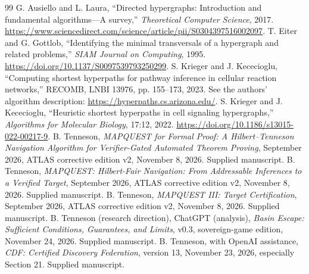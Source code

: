 \documentclass[11pt]{article}
\theoremstyle{remark}\newtheorem{remark}[theorem]{Remark}
\begin{document}
\begin{thebibliography}{99}\small
{} G. Ausiello and L. Laura, ``Directed hypergraphs: Introduction and fundamental algorithms---A survey,'' \emph{Theoretical Computer Science}, 2017. \url{https://www.sciencedirect.com/science/article/pii/S0304397516002097}.
 T. Eiter and G. Gottlob, ``Identifying the minimal transversals of a hypergraph and related problems,'' \emph{SIAM Journal on Computing}, 1995. \url{https://doi.org/10.1137/S0097539793250299}.
 S. Krieger and J. Kececioglu, ``Computing shortest hyperpaths for pathway inference in cellular reaction networks,'' RECOMB, LNBI 13976, pp. 155--173, 2023. See the authors' algorithm description: \url{https://hyperpaths.cs.arizona.edu/}.
 S. Krieger and J. Kececioglu, ``Heuristic shortest hyperpaths in cell signaling hypergraphs,'' \emph{Algorithms for Molecular Biology}, 17:12, 2022. \url{https://doi.org/10.1186/s13015-022-00217-9}.
 B. Tenneson, \emph{MAPQUEST for Formal Proof: A Hilbert--Tenneson Navigation Algorithm for Verifier-Gated Automated Theorem Proving}, September 2026, ATLAS corrective edition v2, November 8, 2026. Supplied manuscript.
 B. Tenneson, \emph{MAPQUEST: Hilbert-Fair Navigation: From Addressable Inferences to a Verified Target}, September 2026, ATLAS corrective edition v2, November 8, 2026. Supplied manuscript.
 B. Tenneson, \emph{MAPQUEST III: Target Certification}, September 2026, ATLAS corrective edition v2, November 8, 2026. Supplied manuscript.
 B. Tenneson (research direction), ChatGPT (analysis), \emph{Basin Escape: Sufficient Conditions, Guarantees, and Limits}, v0.3, sovereign-game edition, November 24, 2026. Supplied manuscript.
 B. Tenneson, with OpenAI assistance, \emph{CDF: Certified Discovery Federation}, version 13, November 23, 2026, especially Section 21. Supplied manuscript.
\end{thebibliography}
\end{document}
